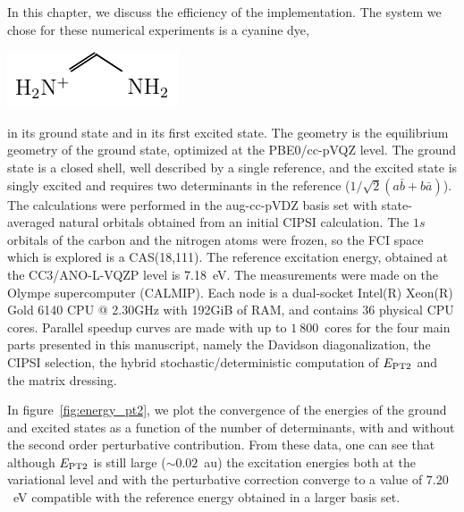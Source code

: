 \documentclass[./thesis.tex]{subfiles}
\begin{document}
\label{chap:PERF}

In this chapter, we discuss the efficiency of the implementation. The system
we chose for these numerical experiments is a cyanine dye, \\
\begin{center}
\includegraphics[]{figures/perf/Cyanine} \\
\end{center}
in its ground state and in its first excited state.
The geometry is the equilibrium geometry of the ground state, optimized at the
PBE0/cc-pVQZ level. The ground state is a closed shell, well described by a
single reference, and the excited state is singly excited and requires two
determinants in the reference ($1/\sqrt{2} (a\bar{b} + b\bar{a})$).  The
calculations were performed in the aug-cc-pVDZ basis set with state-averaged
natural orbitals obtained from an initial CIPSI calculation.
The $1s$ orbitals of the carbon and the nitrogen atoms were frozen, so
the FCI space which is explored is a CAS(18,111). The reference excitation
energy, obtained at the CC3/ANO-L-VQZP level is 7.18~eV.\cite{Send_2011}
The measurements were made on the Olympe supercomputer (CALMIP). Each node is 
a dual-socket Intel(R) Xeon(R) Gold 6140 CPU @ 2.30GHz with 192GiB of RAM, and
contains 36 physical CPU cores. Parallel speedup curves are made with up to
$1~800$~cores for the four main parts presented in this manuscript, namely the
Davidson diagonalization, the CIPSI selection, the hybrid
stochastic/deterministic computation of $E_\text{PT2}$ and the matrix dressing.

In figure~\ref{fig:energy_pt2}, we plot the convergence of the energies of
the ground and excited states as a function of the number of
determinants, with and without the second order perturbative contribution.
From these data, one can see that although $E_\text{PT2}$ is still large ($\sim 0.02$~au)
the excitation energies both at the variational level and with the perturbative
correction converge to a value of $7.20$~eV compatible with the reference
energy obtained in a larger basis set.
\end{document}
